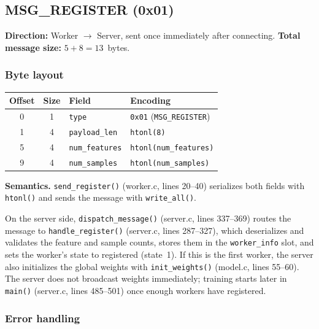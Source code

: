 \documentclass[11pt]{article}
\begin{document}
\subsection{MSG\_REGISTER (0x01)}

\textbf{Direction:} Worker $\to$ Server, sent once immediately after connecting.
\textbf{Total message size:} $5 + 8 = 13$~bytes.

\subsubsection*{Byte layout}

\begin{table}[H]
\centering
\begin{tabular}{@{}c c l l@{}}
\toprule
\textbf{Offset} & \textbf{Size} & \textbf{Field} & \textbf{Encoding} \\
\midrule
0 & 1 & \texttt{type} & \texttt{0x01} (\texttt{MSG\_REGISTER}) \\
1 & 4 & \texttt{payload\_len} & \texttt{htonl(8)} \\
5 & 4 & \texttt{num\_features} & \texttt{htonl(num\_features)} \\
9 & 4 & \texttt{num\_samples} & \texttt{htonl(num\_samples)} \\
\bottomrule
\end{tabular}
\end{table}

\textbf{Semantics.}
\texttt{send\_register()} (worker.c, lines 20--40) serializes both fields with \texttt{htonl()} and sends the message with \texttt{write\_all()}.

On the server side, \texttt{dispatch\_message()} (server.c, lines 337--369) routes the message to \texttt{handle\_register()} (server.c, lines 287--327), which deserializes and validates the feature and sample counts, stores them in the \texttt{worker\_info} slot, and sets the worker's state to registered (state~1). If this is the first worker, the server also initializes the global weights with \texttt{init\_weights()} (model.c, lines 55--60). The server does not broadcast weights immediately; training starts later in \texttt{main()} (server.c, lines 485--501) once enough workers have registered.

\subsubsection*{Error handling}
\end{document}

